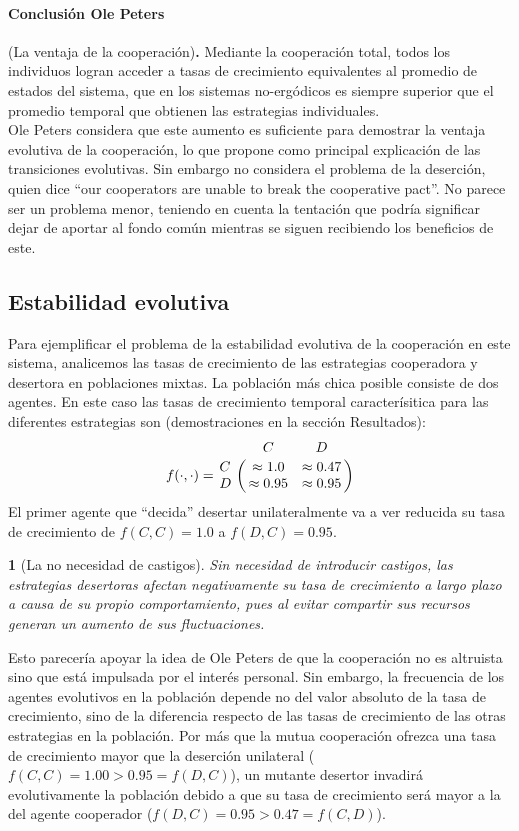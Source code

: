 \documentclass[a4paper,10pt]{article}
\newif\ifen
\newif\ifes
\newcommand{\en}[1]{\ifen#1\fi}
\newcommand{\es}[1]{\ifes#1\fi}
\newtheorem{conclution}{\en{Conclution}\es{Conclusión}}%
\begin{document}
\paragraph{Conclusión Ole Peters} (La ventaja de la cooperación)\textbf{.} Mediante la cooperación total, todos los individuos logran acceder a tasas de crecimiento equivalentes al promedio de estados del sistema, que en los sistemas no-ergódicos es siempre superior que el promedio temporal que obtienen las estrategias individuales. \\


Ole Peters considera que este aumento es suficiente para demostrar la ventaja evolutiva de la cooperación, lo que propone como principal explicación de las transiciones evolutivas.
Sin embargo no considera el problema de la deserción, quien dice ``our cooperators are unable to break the cooperative pact''.
No parece ser un problema menor, teniendo en cuenta la tentación que podría significar dejar de aportar al fondo común mientras se siguen recibiendo los beneficios de este.

\subsection{Estabilidad evolutiva}

Para ejemplificar el problema de la estabilidad evolutiva de la cooperación en este sistema, analicemos las tasas de crecimiento de las estrategias cooperadora y desertora en poblaciones mixtas.
La población más chica posible consiste de dos agentes.
En este caso las tasas de crecimiento temporal caracterísitica para las diferentes estrategias son (demostraciones en la sección Resultados):
%
\begin{equation}
   f(\cdot,\cdot) = \bordermatrix{ & C & D \cr
      C & \approx 1.0 & \approx 0.47 \cr
      D & \approx 0.95 & \approx 0.95 } 
\end{equation}
%
El primer agente que ``decida'' desertar unilateralmente va a ver reducida su tasa de crecimiento de $f(C,C) = 1.0$ a $ f(D,C) = 0.95$.
% 
\begin{conclution}[La no necesidad de castigos]
Sin necesidad de introducir castigos, las estrategias desertoras afectan negativamente su tasa de crecimiento a largo plazo a causa de su propio comportamiento, pues al evitar compartir sus recursos generan un aumento de sus fluctuaciones.
\end{conclution}
Esto parecería apoyar la idea de Ole Peters de que la cooperación no es altruista sino que está impulsada por el interés personal.
Sin embargo, la frecuencia de los agentes evolutivos en la población depende no del valor absoluto de la tasa de crecimiento, sino de la diferencia respecto de las tasas de crecimiento de las otras estrategias en la población.
Por más que la mutua cooperación ofrezca una tasa de crecimiento mayor que la deserción unilateral ($f(C,C) = 1.00 > 0.95 = f(D,C)$), un mutante desertor invadirá evolutivamente la población debido a que su tasa de crecimiento será mayor a la del agente cooperador ($f(D,C) = 0.95 > 0.47 = f(C,D)$). 
\end{document}

